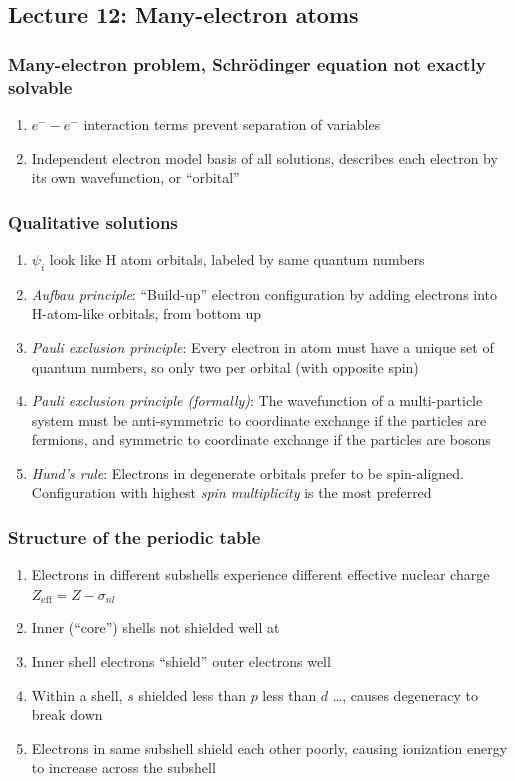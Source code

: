 \documentclass[11pt]{article}
\begin{document}
\subsection{Lecture 12: Many-electron atoms}
\label{sec:org664ccf7}
\subsubsection{Many-electron problem, Schr\"{o}dinger equation not exactly solvable}
\label{sec:orgb4f1ca1}
\begin{enumerate}
\item \(e^- -e^-\) interaction terms prevent separation of variables
\item Independent electron model basis of all solutions, describes each electron by its own wavefunction, or ``orbital''
\end{enumerate}
\subsubsection{Qualitative solutions}
\label{sec:org55ab22d}
\begin{enumerate}
\item \(\psi_i\) look like H atom orbitals,  labeled by same quantum numbers
\item \emph{Aufbau principle}: ``Build-up'' electron configuration by adding electrons into H-atom-like orbitals, from bottom up
\item \emph{Pauli exclusion principle}: Every electron in atom must have a unique set of quantum numbers, so only two per orbital (with opposite spin)
\item \emph{Pauli exclusion principle (formally)}: The wavefunction of a multi-particle system must be anti-symmetric to coordinate exchange if the particles are fermions, and symmetric to coordinate exchange if the particles are bosons
\item \emph{Hund's rule}: Electrons in degenerate orbitals prefer to be spin-aligned.  Configuration with highest \emph{spin multiplicity} is the most preferred
\end{enumerate}
\subsubsection{Structure of the periodic table}
\label{sec:org67607fc}
\begin{enumerate}
\item Electrons in different subshells experience different effective nuclear charge \(Z_\mathrm{eff} = Z - \sigma_{nl}\)
\item Inner (``core'') shells not shielded well at
\item Inner shell electrons ``shield'' outer electrons well
\item Within a shell, \(s\) shielded less than \(p\) less than \(d\) \ldots{}, causes degeneracy to break down
\item Electrons in same subshell shield each other poorly, causing ionization energy to increase across the subshell
\end{enumerate}
\end{document}

